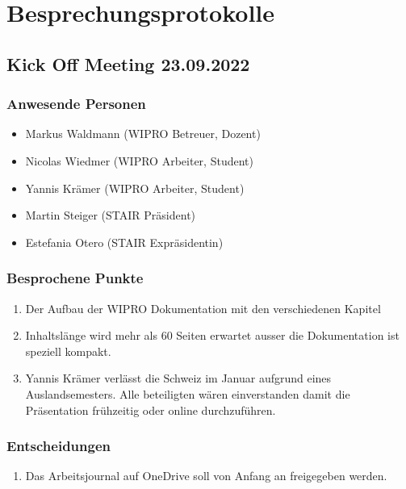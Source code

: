 \documentclass[a4paper, table]{article}
\begin{document}
\newpage
\section{Besprechungsprotokolle}

\subsection{Kick Off Meeting 23.09.2022}

\subsubsection*{Anwesende Personen}

\begin{itemize}
    \item Markus Waldmann (WIPRO Betreuer, Dozent)
    \item Nicolas Wiedmer (WIPRO Arbeiter, Student)
    \item Yannis Krämer (WIPRO Arbeiter, Student)
    \item Martin Steiger (STAIR Präsident)
    \item Estefania Otero (STAIR Expräsidentin)
\end{itemize}

\subsubsection*{Besprochene Punkte}

\begin{enumerate}
    \item Der Aufbau der WIPRO Dokumentation mit den verschiedenen Kapitel
    \item Inhaltslänge wird mehr als 60 Seiten erwartet ausser die Dokumentation ist speziell kompakt.
    \item Yannis Krämer verlässt die Schweiz im Januar aufgrund eines Auslandsemesters. Alle beteiligten wären einverstanden damit die Präsentation frühzeitig oder online durchzuführen.
\end{enumerate}

\subsubsection*{Entscheidungen}

\begin{enumerate}
    \item Das Arbeitsjournal auf OneDrive soll von Anfang an freigegeben werden.
\end{enumerate}
\end{document}
